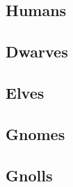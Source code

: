 \documentclass[a4paper,openany]{book}
\begin{document}
\begin{multicols}{2}

\subsection{Humans}

\humanfarmer

\humanmaid

\humansoldier

\royalguard

\humansoldier

\humandiplomat

\humanbard

\humanbard

\humanthief

\humanalchemist

\necromancer

\subsection{Dwarves}

\dwarvensoldier

\dwarventrader

\dwarvenrunemaster

\subsection{Elves}

\elf

\elf

\elvenenchanter

\subsection{Gnomes}

\gnome

\gnomishsoldier

\gnomishsoldier

\gnomishillusionist

\subsection{Gnolls}

\gnollhunter

\gnollshaman

\gnollshaman

\end{multicols}
\end{document}
